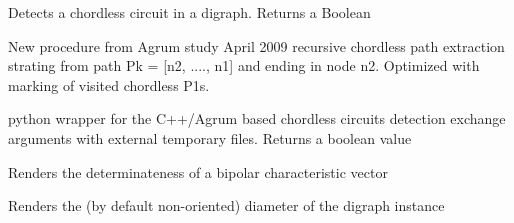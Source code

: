 \documentclass[letterpaper,10pt,english]{sphinxmanual}
\begin{document}
\begin{fulllineitems}
\begin{fulllineitems}
\end{fulllineitems}


\begin{fulllineitems}
\label{techDoc:digraphs.Digraph.detectChordlessCircuits}
Detects a chordless circuit in a digraph.
Returns a Boolean

\end{fulllineitems}


\begin{fulllineitems}
\label{techDoc:digraphs.Digraph.detectChordlessPath}
New procedure from Agrum study April 2009
recursive chordless path extraction strating from path
Pk = {[}n2, ...., n1{]} and ending in node n2.
Optimized with marking of visited chordless P1s.

\end{fulllineitems}


\begin{fulllineitems}
\label{techDoc:digraphs.Digraph.detectCppChordlessCircuits}
python wrapper for the C++/Agrum based chordless circuits detection
exchange arguments with external temporary files.
Returns a boolean value

\end{fulllineitems}


\begin{fulllineitems}
\label{techDoc:digraphs.Digraph.determinateness}
Renders the determinateness of a bipolar characteristic vector

\end{fulllineitems}


\begin{fulllineitems}
\label{techDoc:digraphs.Digraph.diameter}
Renders the (by default non-oriented) diameter of the digraph instance


\end{fulllineitems}
\end{fulllineitems}
\end{document}
